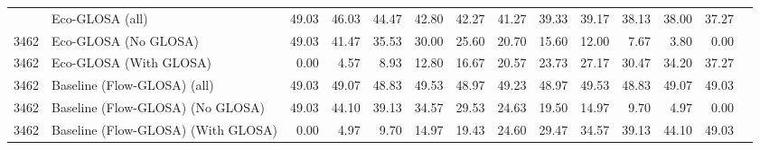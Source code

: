 \begin{table}[ht]
{\begin{tabular}{llrrrrrrrrrrrr}
        \addlinespace
        3462 & Eco-GLOSA (all)                    & 49.03 & 46.03 & 44.47 & 42.80 & 42.27 & 41.27 & 39.33 & 39.17 & 38.13 & 38.00 & 37.27 \\
        3462 & Eco-GLOSA (No GLOSA)               & 49.03 & 41.47 & 35.53 & 30.00 & 25.60 & 20.70 & 15.60 & 12.00 & 7.67 & 3.80 & 0.00 \\
        3462 & Eco-GLOSA (With GLOSA)             & 0.00 & 4.57 & 8.93 & 12.80 & 16.67 & 20.57 & 23.73 & 27.17 & 30.47 & 34.20 & 37.27 \\
        3462 & Baseline (Flow-GLOSA) (all)        & 49.03 & 49.07 & 48.83 & 49.53 & 48.97 & 49.23 & 48.97 & 49.53 & 48.83 & 49.07 & 49.03 \\
        3462 & Baseline (Flow-GLOSA) (No GLOSA)   & 49.03 & 44.10 & 39.13 & 34.57 & 29.53 & 24.63 & 19.50 & 14.97 & 9.70 & 4.97 & 0.00 \\
        3462 & Baseline (Flow-GLOSA) (With GLOSA) & 0.00 & 4.97 & 9.70 & 14.97 & 19.43 & 24.60 & 29.47 & 34.57 & 39.13 & 44.10 & 49.03 \\
        \bottomrule
      \end{tabular}
    }
\end{table}

